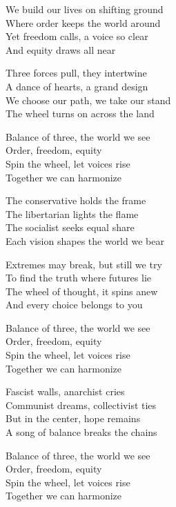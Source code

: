\begin{lyrics}

We build our lives on shifting ground\\
Where order keeps the world around\\
Yet freedom calls, a voice so clear\\
And equity draws all near

Three forces pull, they intertwine\\
A dance of hearts, a grand design\\
We choose our path, we take our stand\\
The wheel turns on across the land

Balance of three, the world we see\\
Order, freedom, equity\\
Spin the wheel, let voices rise\\
Together we can harmonize

The conservative holds the frame\\
The libertarian lights the flame\\
The socialist seeks equal share\\
Each vision shapes the world we bear

Extremes may break, but still we try\\
To find the truth where futures lie\\
The wheel of thought, it spins anew\\
And every choice belongs to you

Balance of three, the world we see\\
Order, freedom, equity\\
Spin the wheel, let voices rise\\
Together we can harmonize

Fascist walls, anarchist cries\\
Communist dreams, collectivist ties\\
But in the center, hope remains\\
A song of balance breaks the chains

Balance of three, the world we see\\
Order, freedom, equity\\
Spin the wheel, let voices rise\\
Together we can harmonize

\end{lyrics}

